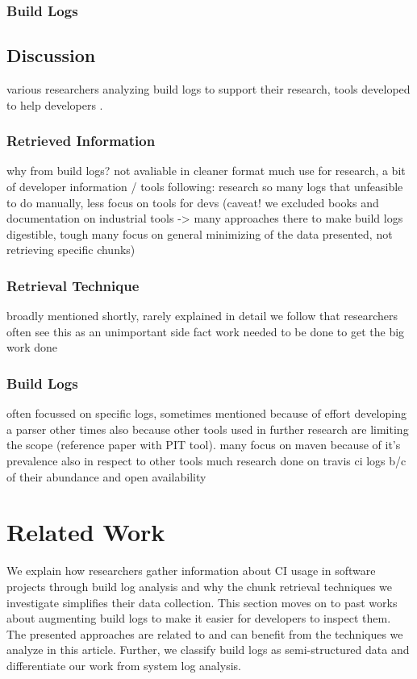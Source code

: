 \subsubsection{Build Logs}

\subsection{Discussion}
various researchers analyzing build logs to support their research,
tools developed to help developers .

\subsubsection{Retrieved Information}
why from build logs? not avaliable in cleaner format much use for
research, a bit of developer information / tools following: research
so many logs that unfeasible to do manually, less focus on tools for
devs (caveat! we excluded books and documentation on industrial tools
-> many approaches there to make build logs digestible, tough many
focus on general minimizing of the data presented, not retrieving
specific chunks)

\subsubsection{Retrieval Technique}
broadly mentioned shortly, rarely explained in detail we follow that
researchers often see this as an unimportant side fact work needed to
be done to get the big work done

\subsubsection{Build Logs}
often focussed on specific logs, sometimes mentioned because of effort
developing a parser other times also because other tools used in
further research are limiting the scope (reference paper with PIT
tool).
many focus on maven because of it's prevalence also in respect
to other tools much research done on travis ci logs b/c of their
abundance and open availability

\section{Related Work}
\label{sec:rw}
We explain how researchers gather information about CI usage in software
projects
through build log analysis and why the chunk retrieval techniques we
investigate
simplifies their data collection.
This section moves on to past works about augmenting build logs to make
it easier
for developers to inspect them.
The presented approaches are related to and can benefit from the
techniques we
analyze in this article.
Further, we classify build logs as semi-structured data and differentiate
our
work from system log analysis.

